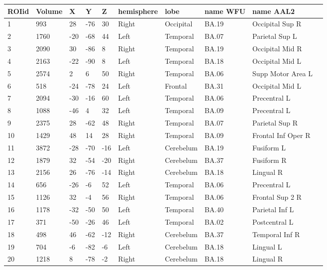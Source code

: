 \begin{table}
\centering
\begin{tabular}[0.2em]{@{}llllllllll@{}}\toprule
ROIid & Volume & X & Y & Z & hemisphere & lobe & name WFU & name AAL2\\\toprule[0.2em]
1 & 993 & 28 & -76 & 30 & Right & Occipital & BA.19 & Occipital Sup R \\\midrule
2 & 1760 & -20 & -68 & 44 & Left & Temporal & BA.07 & Parietal Sup L \\\midrule
3 & 2090 & 30 & -86 & 8 & Right & Temporal & BA.19 & Occipital Mid R \\\midrule
4 & 2163 & -22 & -90 & 8 & Left & Temporal & BA.18 & Occipital Mid L \\\midrule
5 & 2574 & 2 & 6 & 50 & Right & Temporal & BA.06 & Supp Motor Area L \\\midrule
6 & 518 & -24 & -78 & 24 & Left & Frontal & BA.31 & Occipital Mid L \\\midrule
7 & 2094 & -30 & -16 & 60 & Left & Temporal & BA.06 & Precentral L \\\midrule
8 & 1088 & -46 & 4 & 32 & Left & Temporal & BA.09 & Precentral L \\\midrule
9 & 2375 & 28 & -62 & 48 & Right & Temporal & BA.07 & Parietal Sup R \\\midrule
10 & 1429 & 48 & 14 & 28 & Right & Temporal & BA.09 & Frontal Inf Oper R \\\midrule
11 & 3872 & -28 & -70 & -16 & Left & Cerebelum & BA.19 & Fusiform L \\\midrule
12 & 1879 & 32 & -54 & -20 & Right & Cerebelum & BA.37 & Fusiform R \\\midrule
13 & 2156 & 26 & -76 & -14 & Right & Cerebelum & BA.18 & Lingual R \\\midrule
14 & 656 & -26 & -6 & 52 & Left & Temporal & BA.06 & Precentral L \\\midrule
15 & 1126 & 32 & -4 & 56 & Right & Temporal & BA.06 & Frontal Sup 2 R \\\midrule
16 & 1178 & -32 & -50 & 50 & Left & Temporal & BA.40 & Parietal Inf L \\\midrule
17 & 371 & -50 & -26 & 46 & Left & Temporal & BA.02 & Postcentral L \\\midrule
18 & 498 & 46 & -62 & -12 & Right & Cerebelum & BA.37 & Temporal Inf R \\\midrule
19 & 704 & -6 & -82 & -6 & Left & Cerebelum & BA.18 & Lingual L \\\midrule
20 & 1218 & 8 & -78 & -2 & Right & Cerebelum & BA.18 & Lingual R \\\midrule

\end{tabular}
\end{table}
